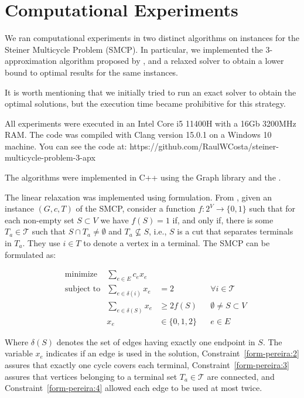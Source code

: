 \chapter{Computational Experiments}
\label{chapter:experiments}

We ran computational experiments in two distinct algorithms on instances for the Steiner Multicycle Problem (SMCP). In particular, we implemented the \(3\)-approximation algorithm proposed by \cite{smcp_3apx}, and a relaxed solver to obtain a lower bound to optimal results for the same instances.

It is worth mentioning that we initially tried to run an exact solver to obtain the optimal solutions, but the execution time became prohibitive for this strategy.

All experiments were executed in an Intel Core i5 11400H with a 16Gb 3200MHz RAM. The code was compiled with Clang version 15.0.1 on a Windows 10 machine. You can see the code at: https://github.com/RaulWCosta/steiner-multicycle-problem-3-apx

The algorithms were implemented in C++ using the Graph library \cite{lemon} and the \cite{gurobi}.

The linear relaxation was implemented using \cite{Pereira2018TheSM} formulation. From \citeauthor{Pereira2018TheSM}, given an instance \((G, c, T)\) of the SMCP, consider a function \(f: 2^V \rightarrow \{0, 1\}\) such that for each non-empty set \(S \subset V\) we have \(f(S) = 1\) if, and only if, there is some \(T_a \in \mathcal{T}\) such that \(S \cap T_a \neq \emptyset\) and \(T_a \nsubseteq S\), i.e., \(S\) is a cut that separates terminals in \(T_a\). They use \(i \in T\) to denote a vertex in a terminal. The SMCP can be formulated as:

\begin{align}
&\text{minimize} &\sum_{e\in E} c_e x_e \label{form-pereira:1}\\
&\text{subject to} &\sum_{e \in \delta(i)} x_e &= 2 &&\text{\(\forall i \in \mathcal{T}\)} \label{form-pereira:2}\\ 
&&\sum_{e \in \delta(S)} x_e &\geq 2 f(S) &&\text{\(\emptyset \neq S \subset V\)} \label{form-pereira:3}\\ 
&&x_e &\in \{0, 1, 2\} &&\text{$e \in E$} \label{form-pereira:4}
\end{align}

Where \(\delta(S)\) denotes the set of edges having exactly one endpoint in \(S\). The variable \(x_e\) indicates if an edge is used in the solution, Constraint~\eqref{form-pereira:2} assures that exactly one cycle covers each terminal, Constraint~\eqref{form-pereira:3} assures that vertices belonging to a terminal set \(T_a \in \mathcal{T}\) are connected, and Constraint~\eqref{form-pereira:4} allowed each edge to be used at most twice.

